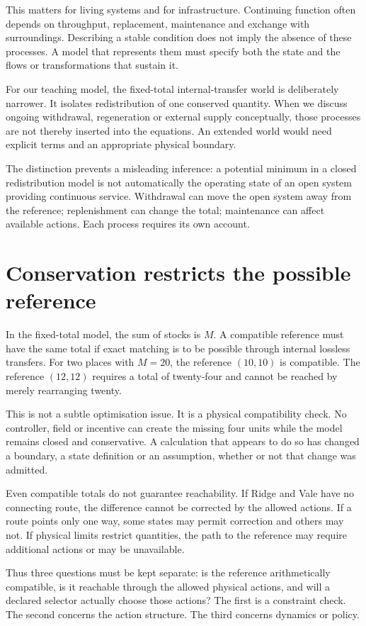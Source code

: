 This matters for living systems and for infrastructure. Continuing function often depends on throughput, replacement, maintenance and exchange with surroundings. Describing a stable condition does not imply the absence of these processes. A model that represents them must specify both the state and the flows or transformations that sustain it.

For our teaching model, the fixed-total internal-transfer world is deliberately narrower. It isolates redistribution of one conserved quantity. When we discuss ongoing withdrawal, regeneration or external supply conceptually, those processes are not thereby inserted into the equations. An extended world would need explicit terms and an appropriate physical boundary.

The distinction prevents a misleading inference: a potential minimum in a closed redistribution model is not automatically the operating state of an open system providing continuous service. Withdrawal can move the open system away from the reference; replenishment can change the total; maintenance can affect available actions. Each process requires its own account.

\section{Conservation restricts the possible reference}
In the fixed-total model, the sum of stocks is $M$. A compatible reference must have the same total if exact matching is to be possible through internal lossless transfers. For two places with $M=20$, the reference $(10,10)$ is compatible. The reference $(12,12)$ requires a total of twenty-four and cannot be reached by merely rearranging twenty.

This is not a subtle optimisation issue. It is a physical compatibility check. No controller, field or incentive can create the missing four units while the model remains closed and conservative. A calculation that appears to do so has changed a boundary, a state definition or an assumption, whether or not that change was admitted.

Even compatible totals do not guarantee reachability. If Ridge and Vale have no connecting route, the difference cannot be corrected by the allowed actions. If a route points only one way, some states may permit correction and others may not. If physical limits restrict quantities, the path to the reference may require additional actions or may be unavailable.

Thus three questions must be kept separate: is the reference arithmetically compatible, is it reachable through the allowed physical actions, and will a declared selector actually choose those actions? The first is a constraint check. The second concerns the action structure. The third concerns dynamics or policy.

